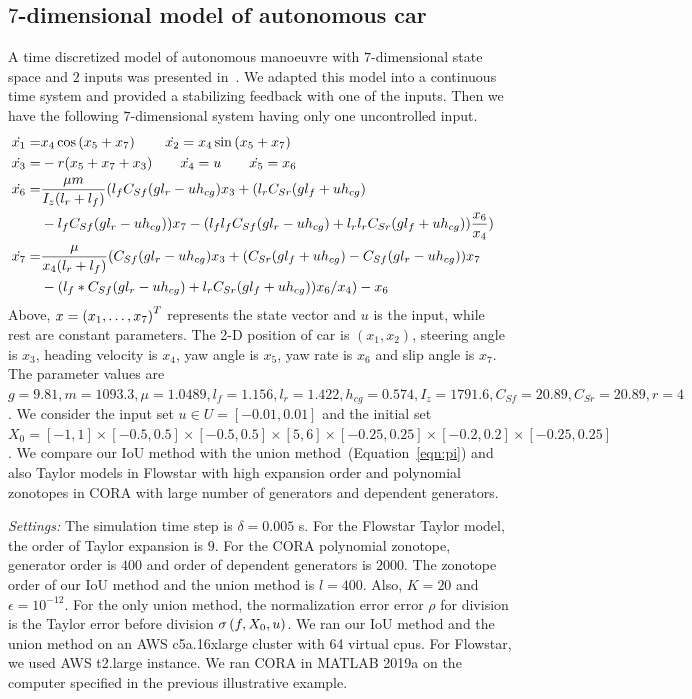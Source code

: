 \subsection{$7$-dimensional model of autonomous car}
A time discretized model of autonomous manoeuvre with $7$-dimensional
state space and $2$ inputs was presented in~\cite{lavaei2020formal}.
We adapted this model into a continuous time system and provided a
stabilizing feedback with one of the inputs.  Then we have the
following $7$-dimensional system having only one
uncontrolled input.
%
\begin{align*}
\dot{x_1}  = & x_4\cos\rb{x_5+x_7}\hspace{2em} \dot{x_2} =
x_4\sin\rb{x_5+x_7}\\
%
\dot{x_3}  = & -r(x_5+x_7+x_3) \hspace{2em} \dot{x_4} =
 u \hspace{2em} \dot{x_5} = x_6 & \\
 \dot{x_6}  = & \frac{\mu
 m}{I_z(l_r+l_f)}(l_fC_{Sf}(gl_r-uh_{cg})x_3+
 (l_rC_{Sr}(gl_f+uh_{cg})\\& -l_fC_{Sf}(gl_r-uh_{cg}))x_7
 -(l_fl_fC_{Sf}(gl_r-uh_{cg}) + l_rl_rC_{Sr}(gl_f+uh_{cg}))\frac{x_6}{x_4})\\
%
\dot{x_7} 
= & \frac{\mu}{x_4(l_r+l_f)}(C_{Sf}(gl_r-uh_{cg})x_3+(C_{Sr}(gl_f+uh_{cg})-C_{Sf}(gl_r-uh_{cg}))x_7\\
&-(l_f*C_{Sf}(gl_r-uh_{cg}) + l_rC_{Sr}(gl_f+uh_{cg}))x_6/x_4)-x_6
\end{align*}
%
Above, $x = \left(x_1,\ldots,x_7\right)^T$ represents the state vector and $u$
is the input, while rest are constant parameters.  The 2-D position of
car is $(x_1,x_2)$, steering angle is $x_3$, heading velocity is
$x_4$, yaw angle is $x_5$, yaw rate is $x_6$ and slip angle is $x_7$.
The parameter values are
%
$ g = 9.81, m = 1093.3, \mu = 1.0489, l_f = 1.156, l_r = 1.422, h_{cg}
  = 0.574, I_z = 1791.6, C_{Sf} = 20.89, C_{Sr} = 20.89, r = 4 $.  We
  consider the input set $u\in U = [-0.01,0.01]$ and the initial set
  $X_0 =
  [-1,1]\times[-0.5,0.5]\times[-0.5,0.5]\times[5,6]\times[-0.25,0.25]\times[-0.2,0.2]\times[-0.25,0.25]$.
  We compare our IoU method with the union
  method~(Equation~\ref{eqn:pi}) and also Taylor models in Flowstar
  with high expansion order and polynomial zonotopes in CORA with
  large number of generators and dependent generators.

\emph{Settings:}  The simulation time step is $\delta = 0.005$ s.  For
  the Flowstar Taylor model, the order of Taylor expansion is $9$.  For
  the CORA polynomial zonotope, generator order is $400$ and order of
  dependent generators is $2000$.  The zonotope order of our IoU
  method and the union method is $l=400$.  Also, $K = 20$ and
  $\epsilon = 10^{-12}$.  For the only union method, the normalization error
  error $\rho$ for division is the Taylor error before division
  $\sigma\left(f,X_0,u\right)$.  We ran our IoU method and the union method on
  an AWS c5a.16xlarge cluster with 64 virtual cpus.  For Flowstar, we
  used AWS t2.large instance.  We ran CORA in MATLAB 2019a on the
  computer specified in the previous illustrative example.

